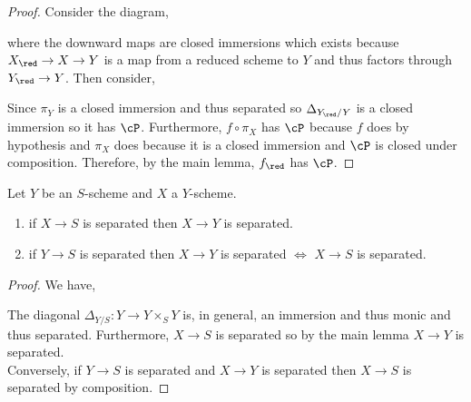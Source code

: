 \documentclass[12pt]{article}
\begin{document}
\begin{proof}
Consider the diagram,
\begin{center}
\end{center}
where the downward maps are closed immersions which exists because $X_{\red} \to X \to Y$ is a map from a reduced scheme to $Y$ and thus factors through $Y_{\red} \to Y$. Then consider,
\begin{center}
\end{center} 
Since $\pi_Y$ is a closed immersion and thus separated so $\Delta_{Y_\red / Y}$ is a closed immersion so it has $\cP$. Furthermore, $f \circ \pi_X$ has $\cP$ because $f$ does by hypothesis and $\pi_X$ does because it is a closed immersion and $\cP$ is closed under composition. Therefore, by the main lemma, $f_{\red}$ has $\cP$.
\end{proof}

\begin{cor}
Let $Y$ be an $S$-scheme and $X$ a $Y$-scheme.
\begin{enumerate}
\item if $X \to S$ is separated then $X \to Y$ is separated.
\item if $Y \to S$ is separated then $X \to Y$ is separated $\iff$ $X \to S$ is separated.
\end{enumerate}
\end{cor}

\begin{proof}
We have,
\begin{center}
\end{center}
The diagonal $\Delta_{Y/S} : Y \to Y \times_S Y$ is, in general, an immersion and thus monic and thus separated. Furthermore, $X \to S$ is separated so by the main lemma $X \to Y$ is separated. 
\bigskip\\
Conversely, if $Y \to S$ is separated and $X \to Y$ is separated then $X \to S$ is separated by composition.
\end{proof}
\end{document}
